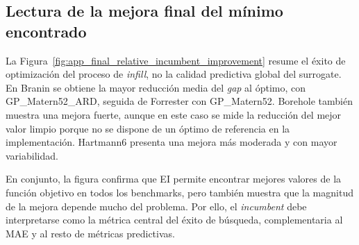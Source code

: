 
\subsection*{Lectura de la mejora final del mínimo encontrado}

La Figura~\ref{fig:app_final_relative_incumbent_improvement} resume el éxito de optimización del proceso de \emph{infill}, no la calidad predictiva global del surrogate. En Branin se obtiene la mayor reducción media del \emph{gap} al óptimo, con GP\_Matern52\_ARD, seguida de Forrester con GP\_Matern52. Borehole también muestra una mejora fuerte, aunque en este caso se mide la reducción del mejor valor limpio porque no se dispone de un óptimo de referencia en la implementación. Hartmann6 presenta una mejora más moderada y con mayor variabilidad.

En conjunto, la figura confirma que EI permite encontrar mejores valores de la función objetivo en todos los benchmarks, pero también muestra que la magnitud de la mejora depende mucho del problema. Por ello, el \emph{incumbent} debe interpretarse como la métrica central del éxito de búsqueda, complementaria al MAE y al resto de métricas predictivas.

